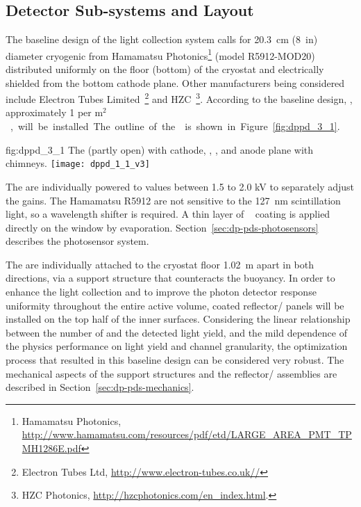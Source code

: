 \subsection{Detector Sub-systems and Layout}
\label{sec:dp-pds-overview_layout}

The baseline design of the light collection system calls for \SI{20.3}{cm} (\SI{8}{in}) diameter cryogenic  from Hamamatsu Photonics\footnote{Hamamatsu Photonics\texttrademark{}, \url{http://www.hamamatsu.com/resources/pdf/etd/LARGE_AREA_PMT_TPMH1286E.pdf}} (model R5912-MOD20) distributed uniformly on the floor (bottom) of the cryostat and electrically shielded from the bottom cathode plane. Other  manufacturers being considered include Electron Tubes Limited~\footnote{Electron Tubes Ltd\texttrademark{}, \url{http://www.electron-tubes.co.uk//}} and HZC~\footnote{HZC Photonics\texttrademark{}, \url{http://hzcphotonics.com/en_index.html}.}. According to the baseline design, \dpnumpmtch {}, approximately \num{1} per \si{m$^2$}, will be installed. The outline of the  is shown in Figure~\ref{fig:dppd_3_1}.

\begin{dunefigure}{fig:dppd_3_1}
{The  (partly open) with cathode, , , and anode plane with chimneys.}
\texttt{[image: dppd\_1\_1\_v3]}
\end{dunefigure}

The  are individually powered to values between \num{1.5} to \num{2.0} \si{\kV} to separately adjust the  gains. The Hamamatsu R5912  are not sensitive to the \SI{127}{nm} scintillation light, so a wavelength shifter is required. A thin layer of ~\cite{tpb} coating is applied directly on the  window by evaporation. Section~\ref{sec:dp-pds-photosensors} describes the photosensor system.

The \dpnumpmtch {} are individually attached to the cryostat floor \SI{1.02}{m} apart in both directions, via a  support structure that counteracts the  buoyancy. In order to enhance the light collection and to improve the photon detector response uniformity throughout the entire  active volume,  coated reflector/ panels will be installed on the top half of the  inner surfaces. Considering the linear relationship between the number of  and the detected light yield, and the mild dependence of the  physics performance on light yield and channel granularity, the optimization process that resulted in this baseline design can be considered very robust. The mechanical aspects of the  support structures and the reflector/ assemblies are described in Section~\ref{sec:dp-pds-mechanics}.

